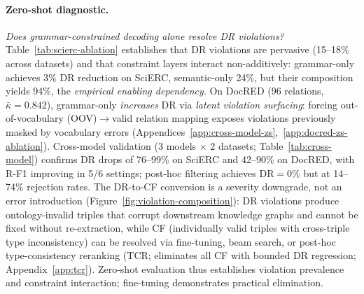 \paragraph{Zero-shot diagnostic.}
\emph{Does grammar-constrained decoding alone resolve DR violations?}
Table~\ref{tab:scierc-ablation} establishes that DR violations are pervasive (15--18\% across datasets) and that constraint layers interact non-additively: grammar-only achieves 3\% DR reduction on SciERC, semantic-only 24\%, but their composition yields 94\%, the \emph{empirical enabling dependency}.
On DocRED (96 relations, $\bar{\kappa}{=}0.842$), grammar-only \emph{increases} DR via \textit{latent violation surfacing}: forcing out-of-vocabulary (OOV)$\to$valid relation mapping exposes violations previously masked by vocabulary errors (Appendices~\ref{app:cross-model-zs},~\ref{app:docred-zs-ablation}).
Cross-model validation (3 models $\times$ 2 datasets; Table~\ref{tab:cross-model}) confirms DR drops of 76--99\% on SciERC and 42--90\% on DocRED, with R-F1 improving in 5/6 settings; post-hoc filtering achieves DR${=}$0\% but at 14--74\% rejection rates.
The DR-to-CF conversion is a severity downgrade, not an error introduction (Figure~\ref{fig:violation-composition}): DR violations produce ontology-invalid triples that corrupt downstream knowledge graphs and cannot be fixed without re-extraction, while CF (individually valid triples with cross-triple type inconsistency) can be resolved via fine-tuning, beam search, or post-hoc type-consistency reranking (TCR; eliminates all CF with bounded DR regression; Appendix~\ref{app:tcr}).
Zero-shot evaluation thus establishes violation prevalence and constraint interaction; fine-tuning demonstrates practical elimination.



